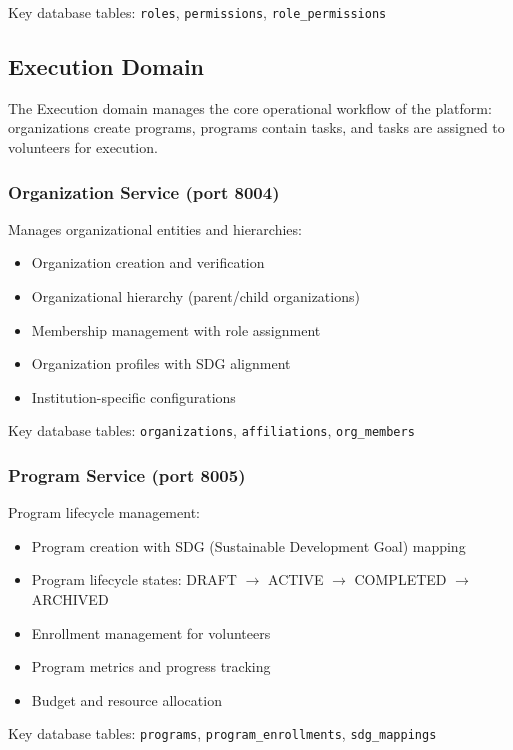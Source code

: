\documentclass[11pt,a4paper]{article}
\begin{document}
Key database tables: \texttt{roles}, \texttt{permissions}, \texttt{role\_permissions}

\subsection{Execution Domain}

The Execution domain manages the core operational workflow of the platform: organizations create programs, programs contain tasks, and tasks are assigned to volunteers for execution.

\subsubsection{Organization Service (port 8004)}

Manages organizational entities and hierarchies:
\begin{itemize}
  \item Organization creation and verification
  \item Organizational hierarchy (parent/child organizations)
  \item Membership management with role assignment
  \item Organization profiles with SDG alignment
  \item Institution-specific configurations
\end{itemize}

Key database tables: \texttt{organizations}, \texttt{affiliations}, \texttt{org\_members}

\subsubsection{Program Service (port 8005)}

Program lifecycle management:
\begin{itemize}
  \item Program creation with SDG (Sustainable Development Goal) mapping
  \item Program lifecycle states: DRAFT $\rightarrow$ ACTIVE $\rightarrow$ COMPLETED $\rightarrow$ ARCHIVED
  \item Enrollment management for volunteers
  \item Program metrics and progress tracking
  \item Budget and resource allocation
\end{itemize}

Key database tables: \texttt{programs}, \texttt{program\_enrollments}, \texttt{sdg\_mappings}
\end{document}
